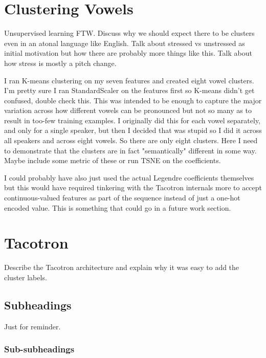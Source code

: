 \documentclass{article}
\begin{document}
\section{Clustering Vowels}
\label{sec:vowels}



Unsupervised learning FTW. Discuss why we should expect there to be clusters even in an atonal language like English. Talk about stressed vs unstressed as initial motivation but how there are probably more things like this. Talk about how stress is mostly a pitch change.

I ran K-means clustering on my seven features and created eight vowel clusters. I'm pretty sure I ran StandardScaler on the features first so K-means didn't get confused, double check this. This was intended to be enough to capture the major variation across how different vowels can be pronounced but not so many as to result in too-few training examples. I originally did this for each vowel separately, and only for a single speaker, but then I decided that was stupid so I did it across all speakers and across eight vowels. So there are only eight clusters. Here I need to demonstrate that the clusters are in fact "semantically" different in some way. Maybe include some metric of these or run TSNE on the coefficients.

I could probably have also just used the actual Legendre coefficients themselves but this would have required tinkering with the Tacotron internals more to accept continuous-valued features as part of the sequence instead of just a one-hot encoded value. This is something that could go in a future work section.

\section{Tacotron}
\label{sec:tacotron}

Describe the Tacotron architecture and explain why it was easy to add the cluster labels.

\subsection{Subheadings}
\label{ssec:subhead}

Just for reminder.

\subsubsection{Sub-subheadings}
\label{sssec:subsubhead}
\end{document}
